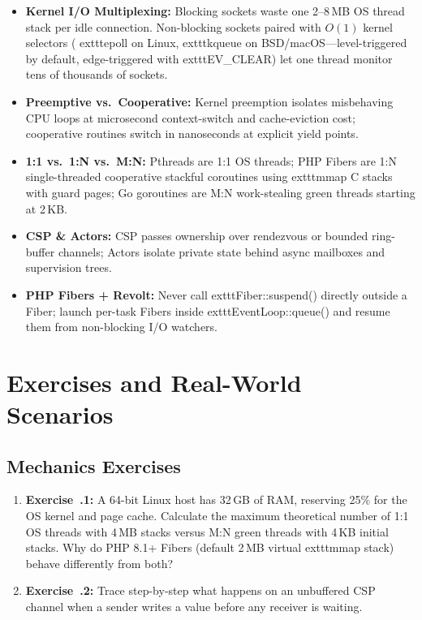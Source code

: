 \begin{itemize}[leftmargin=15pt]
  \item \textbf{Kernel I/O Multiplexing:} Blocking sockets waste one 2--8\,MB OS thread stack per idle connection. Non-blocking sockets paired with $O(1)$ kernel selectors (	exttt{epoll} on Linux, 	exttt{kqueue} on BSD/macOS---level-triggered by default, edge-triggered with 	exttt{EV\_CLEAR}) let one thread monitor tens of thousands of sockets.
  \item \textbf{Preemptive vs.\ Cooperative:} Kernel preemption isolates misbehaving CPU loops at microsecond context-switch and cache-eviction cost; cooperative routines switch in nanoseconds at explicit yield points.
  \item \textbf{1:1 vs.\ 1:N vs.\ M:N:} Pthreads are 1:1 OS threads; PHP Fibers are 1:N single-threaded cooperative stackful coroutines using 	exttt{mmap} C stacks with guard pages; Go goroutines are M:N work-stealing green threads starting at 2\,KB.
  \item \textbf{CSP \& Actors:} CSP passes ownership over rendezvous or bounded ring-buffer channels; Actors isolate private state behind async mailboxes and supervision trees.
  \item \textbf{PHP Fibers + Revolt:} Never call 	exttt{Fiber::suspend()} directly outside a Fiber; launch per-task Fibers inside 	exttt{EventLoop::queue()} and resume them from non-blocking I/O watchers.
\end{itemize}

\section{Exercises and Real-World Scenarios}

\subsection{Mechanics Exercises}
\begin{enumerate}[leftmargin=15pt]
  \item \textbf{Exercise~\thechapter.1:} A 64-bit Linux host has 32\,GB of RAM, reserving 25\% for the OS kernel and page cache. Calculate the maximum theoretical number of 1:1 OS threads with 4\,MB stacks versus M:N green threads with 4\,KB initial stacks. Why do PHP 8.1+ Fibers (default 2\,MB virtual 	exttt{mmap} stack) behave differently from both?
  \item \textbf{Exercise~\thechapter.2:} Trace step-by-step what happens on an unbuffered CSP channel when a sender writes a value before any receiver is waiting.
\end{enumerate}

